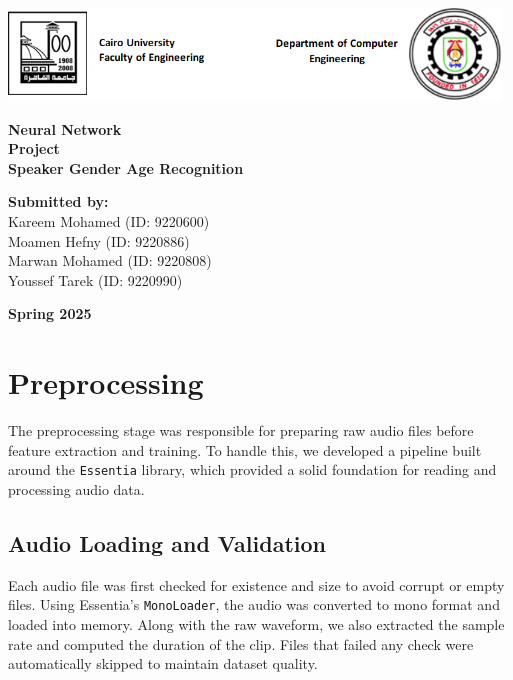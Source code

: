 \documentclass[a4paper,12pt]{article}
\begin{document}
\begin{titlepage}
    \centering
    \vspace*{1cm}

    \includegraphics[width=0.98\textwidth]{image.png}

    \vfill
    
    \textbf{\Huge Neural Network}\\
    \textbf{\Large Project \\ Speaker Gender Age  Recognition}\\
    
    \vfill

    \textbf{Submitted by:}\\
    Kareem Mohamed \quad (ID: 9220600) \\
    Moamen Hefny  \quad (ID: 9220886) \\
    Marwan Mohamed \quad (ID: 9220808) \\
    Youssef Tarek \quad (ID: 9220990) \\
    
    \vfill
    
    \textbf{Spring 2025}
    
\end{titlepage}

\tableofcontents
\newpage

\section{Preprocessing}

The preprocessing stage was responsible for preparing raw audio files before feature extraction and training. To handle this, we developed a pipeline built around the \texttt{Essentia} library, which provided a solid foundation for reading and processing audio data.

\subsection{Audio Loading and Validation}

Each audio file was first checked for existence and size to avoid corrupt or empty files. Using Essentia’s \texttt{MonoLoader}, the audio was converted to mono format and loaded into memory. Along with the raw waveform, we also extracted the sample rate and computed the duration of the clip. Files that failed any check were automatically skipped to maintain dataset quality.
\end{document}
